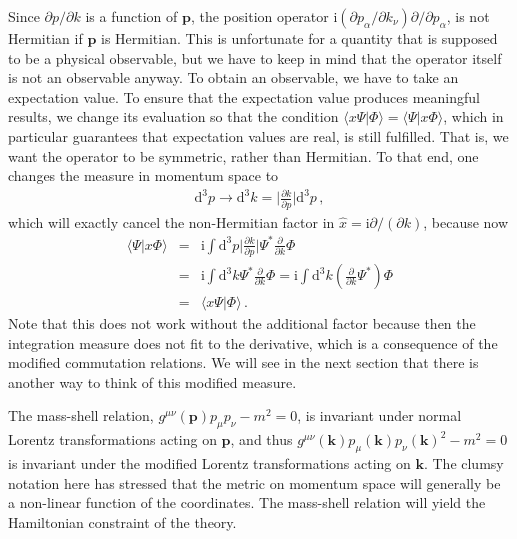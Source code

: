 \documentclass{article}
\def\beqn{\begin{eqnarray}}
\def\eeqn{\end{eqnarray}}
\begin{document}
Since
$\partial p/\partial k$ is a function of $\mathbf{p}$, the position operator $\mathrm{i} (\partial p_\alpha/\partial k_\nu) \partial/\partial p_\alpha$,  is not Hermitian if $\mathbf{p}$ is Hermitian. This is unfortunate for a quantity that is supposed to be a physical observable, but we have to keep in mind that the
operator itself is not an observable anyway. To obtain an observable, we have to take an expectation value. To ensure that the
expectation value produces meaningful results, we change its evaluation so that the condition $\langle x \Psi | \Phi \rangle = \langle \Psi | x \Phi \rangle$,
which in particular guarantees that expectation values are real, is still fulfilled. That is, we want the operator to be symmetric, rather than
Hermitian.%
To that end, one changes the measure in momentum space to~\cite{Kempf:1993bq,Kempf:1994su}
\beqn
\mathrm{d}^3 p \to \mathrm{d}^3 k = \Big| \frac{\partial k}{\partial
  p} \Big| \mathrm{d}^3 p \,, \label{measuremomentum}
\eeqn
which will exactly cancel the non-Hermitian factor in $\hat x = \mathrm{i} \partial/(\partial k)$, because now
\beqn
\langle \Psi | x \Phi \rangle &=& \mathrm{i} \int \mathrm{d}^3 p \Big| \frac{\partial k}{\partial p} \Big| \Psi^* \frac{\partial}{\partial k}  \Phi  \nonumber \\
&=& \mathrm{i} \int \mathrm{d}^3 k \Psi^* \frac{\partial}{\partial k}
\Phi  = \mathrm{i} \int \mathrm{d}^3 k (\frac{\partial}{\partial k}  \Psi^*) \Phi \nonumber \\
&=& \langle  x  \Psi  | \Phi \rangle \,.
\eeqn
Note that this does not work without the additional factor because then the integration measure does not fit to the derivative,
which is a consequence of the modified commutation relations. We will see in the next section that there is another way
to think of this modified measure.

The mass-shell relation, $g^{\mu \nu}(\mathbf{p}) p_\mu p_\nu - m^2 =0$, is invariant under normal Lorentz transformations acting on $\mathbf{p}$, and thus $g^{\mu \nu}(\mathbf{k})p_\mu(\mathbf{k}) p_\nu(\mathbf{k})^2 - m^2 = 0$ is invariant under the modified Lorentz transformations 
acting on $\mathbf{k}$. The clumsy notation here has stressed that the metric on momentum
space will generally be a non-linear function of the coordinates. The mass-shell relation will yield the Hamiltonian
constraint of the theory. 
\end{document}
